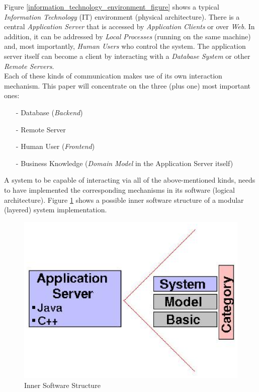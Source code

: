 Figure \ref{information_technology_environment_figure} shows a typical
\emph{Information Technology} (IT) environment (physical architecture).
There is a central \emph{Application Server} that is accessed by
\emph{Application Clients} or over \emph{Web}. In addition, it can be addressed
by \emph{Local Processes} (running on the same machine) and, most importantly,
\emph{Human Users} who control the system. The application server itself can
become a client by interacting with a \emph{Database System} or other
\emph{Remote Servers}.\\
Each of these kinds of communication makes use of its own interaction mechanism.
This paper will concentrate on the three (plus one) most important ones:
\begin{itemize}
    \item[-] Database (\emph{Backend})
    \item[-] Remote Server
    \item[-] Human User (\emph{Frontend})
    \item[-] Business Knowledge (\emph{Domain Model} in the Application Server itself)
\end{itemize}

A system to be capable of interacting via all of the above-mentioned kinds, needs to
have implemented the corresponding mechanisms in its software (logical architecture).
Figure \ref{inner_software_structure_figure} shows a possible inner software
structure of a modular (layered) system implementation.

\begin{figure}[ht]
    \begin{center}
        \includegraphics[scale=0.3]{vector/inner_software_structure.eps}
        \caption{Inner Software Structure}
        \label{inner_software_structure_figure}
    \end{center}
\end{figure}

